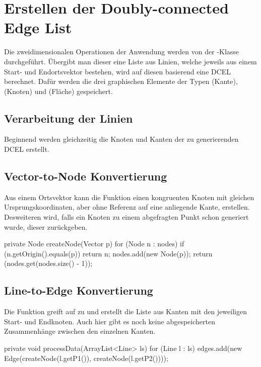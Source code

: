 \section{Erstellen der Doubly-connected Edge List}
Die zweidimensionalen Operationen der Anwendung werden von der -Klasse durchgeführt. 
Übergibt man dieser eine Liste aus Linien, welche jeweils aus einem Start- und Endortsvektor bestehen, wird auf diesen basierend eine DCEL berechnet.
Dafür werden die drei graphischen Elemente der Typen (Kante), (Knoten) und (Fläche) gespeichert.

\subsection{Verarbeitung der Linien}
Beginnend werden gleichzeitig die Knoten und Kanten der zu generierenden DCEL erstellt.
\subsection{Vector-to-Node Konvertierung}
Aus einem Ortsvektor kann die Funktion  einen kongruenten Knoten mit gleichen Ursprungskoordinaten, aber ohne Referenz auf eine anliegende Kante, erstellen. 
Desweiteren wird, falls ein Knoten zu einem abgefragten Punkt schon generiert wurde, dieser zurückgeben. \\

\begin{code}
	private Node createNode(Vector p) {
		for (Node n : nodes) {
			if (n.getOrigin().equals(p)) {
				return n;
			}
		}
		nodes.add(new Node(p));
		return (nodes.get(nodes.size() - 1));
	}
\end{code}

\subsection{Line-to-Edge Konvertierung}
\label{subsec:ltoe} 
Die  Funktion greift auf  zu und erstellt die Liste aus Kanten mit den jeweiligen Start- und Endknoten.
Auch hier gibt es noch keine abgespeicherten Zusammenhänge zwischen den einzelnen Kanten. \\

\begin{code}
	private void processData(ArrayList<Line> ls) {
		for (Line l : ls) {
			edges.add(new Edge(createNode(l.getP1()), createNode(l.getP2())));
		}
	}
\end{code}

